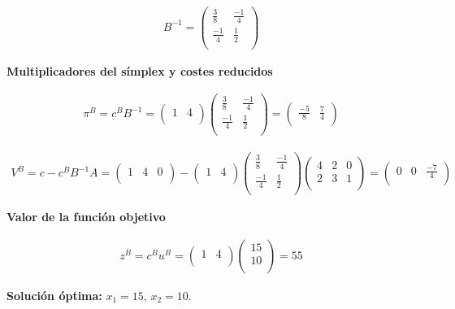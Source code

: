 \begin{equation}
\begin{split}
B^{-1} =\begin{pmatrix}
\frac{3}{8} & \frac{-1}{4}\\
\frac{-1}{4} & \frac{1}{2}\\
\end{pmatrix}
\end{split}
\end{equation}

\textbf{Multiplicadores del símplex y costes reducidos}

\begin{equation}
\begin{split}
\pi^B = c^BB^{-1} = \begin{pmatrix}
1 & 4\\
\end{pmatrix}
\begin{pmatrix}
\frac{3}{8} & \frac{-1}{4}\\
\frac{-1}{4} & \frac{1}{2}\\
\end{pmatrix}
 = \begin{pmatrix}
\frac{-5}{8} & \frac{7}{4}\\
\end{pmatrix}
\end{split}
\end{equation}

\begin{equation}
\begin{split}
V^B = c-c^BB^{-1}A = \begin{pmatrix}
1 & 4 & 0\\
\end{pmatrix}
 - \begin{pmatrix}
1 & 4\\
\end{pmatrix}
\begin{pmatrix}
\frac{3}{8} & \frac{-1}{4}\\
\frac{-1}{4} & \frac{1}{2}\\
\end{pmatrix}
\begin{pmatrix}
4 & 2 & 0\\
2 & 3 & 1\\
\end{pmatrix}
 = \begin{pmatrix}
0 & 0 & \frac{-7}{4}\\
\end{pmatrix}
\end{split}
\end{equation}

\textbf{Valor de la función objetivo}

\begin{equation}
\begin{split}
z^B=c^Bu^B = \begin{pmatrix}
1 & 4\\
\end{pmatrix}
\begin{pmatrix}
15\\
10\\
\end{pmatrix}
 = 55\end{split}
\end{equation}

\textbf{Solución óptima:} $x_{1} = 15$, $x_{2} = 10$.
